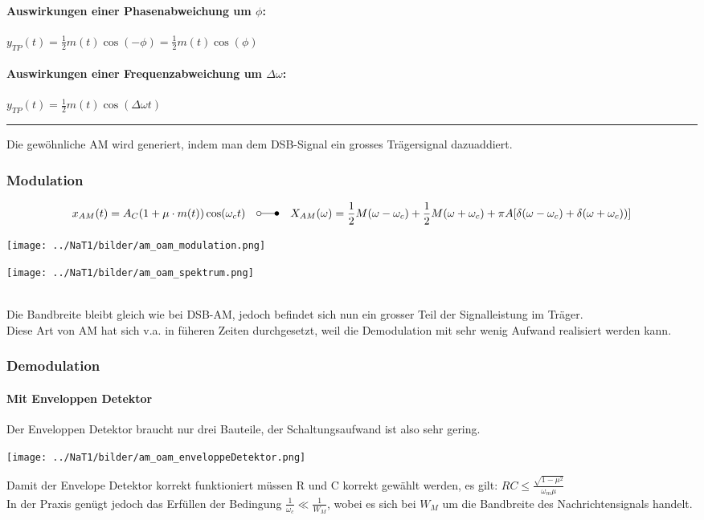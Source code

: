 \paragraph{Auswirkungen einer Phasenabweichung um $\phi$:} $y_{TP}(t) = \frac{1}{2}
m(t) \cos(-\phi)= \frac{1}{2} m(t) \cos(\phi) $
\paragraph{Auswirkungen einer Frequenzabweichung um $\Delta \omega$:} $y_{TP}(t) =
\frac{1}{2} m(t) \cos(\Delta \omega t)$\\


\hrule
{}
Die gewöhnliche AM wird generiert, indem man dem DSB-Signal ein grosses Trägersignal dazuaddiert.

\subsubsection{Modulation}

$$x_{AM}(t) = A_C (1 + \mu \cdot m(t)) \cos(\omega_c t)
	\quad \laplace \quad X_{AM}(\omega) = \frac{1}{2}M(\omega - \omega_c) + \frac{1}{2}M(\omega + \omega_c)
	+ \pi A [\delta (\omega - \omega_c) + \delta (\omega + \omega_c))]$$

\begin{minipage}[]{9cm}
	\texttt{[image: ../NaT1/bilder/am\_oam\_modulation.png]}
\end{minipage}
\begin{minipage}[]{9cm}
    \texttt{[image: ../NaT1/bilder/am\_oam\_spektrum.png]}
\end{minipage}\\
Die Bandbreite bleibt gleich wie bei DSB-AM, jedoch befindet sich nun ein grosser Teil der
Signalleistung im Träger. \\
Diese Art von AM hat sich v.a. in füheren Zeiten durchgesetzt, weil die Demodulation mit sehr
wenig Aufwand realisiert werden kann. 

\subsubsection{Demodulation}
\paragraph{Mit Enveloppen Detektor}
Der Enveloppen Detektor braucht nur drei Bauteile, der Schaltungsaufwand ist also
sehr gering.\\
\begin{center}	
      \texttt{[image: ../NaT1/bilder/am\_oam\_enveloppeDetektor.png]}
\end{center}
Damit der Envelope Detektor korrekt funktioniert müssen R und C korrekt gewählt werden, es gilt:
$RC \leq \frac{\sqrt{1 - \mu^2}}{\omega_m \mu}$ \\
In der Praxis genügt jedoch das Erfüllen der Bedingung $\frac{1}{\omega_c} \ll \frac{1}{W_M}$,
wobei es sich bei $W_M$ um die Bandbreite des Nachrichtensignals handelt. 


